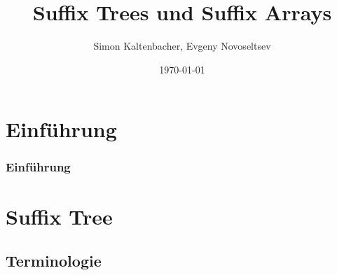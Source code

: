\documentclass{beamer}
\title{Suffix Trees und Suffix Arrays}
\author{Simon Kaltenbacher, Evgeny Novoseltsev}
\date{\today}
\begin{document}
\frame{\titlepage}


\section{Einführung}

\begin{frame}
\frametitle{Einführung}
\end{frame}

\section{Suffix Tree}

\subsection{Terminologie}
\end{document}
